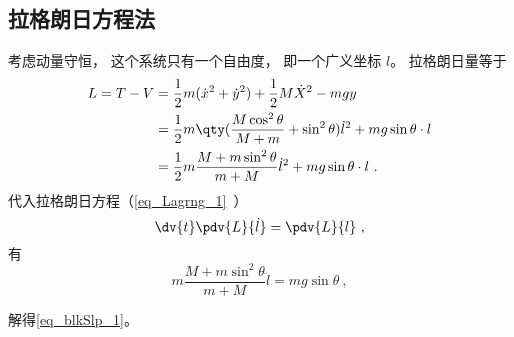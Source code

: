 \subsection{拉格朗日方程法}
考虑动量守恒， 这个系统只有一个自由度， 即一个广义坐标 $l$。 拉格朗日量等于
\begin{equation}
\begin{aligned}
L = T - V &= \frac12 m(\dot x^2 + \dot y^2) + \frac12 M \dot X^2 - mgy\\
&= \frac{1}{2}m \qty( \frac{M\cos^2\theta}{M + m}+\sin^2\theta) \dot l^2 + mg\sin\theta \cdot l\\
&=\frac{1}{2}m\frac{M+m\sin^2\theta}{m+M}\dot{l}^2+mg\sin\theta\cdot l~.
\end{aligned}
\end{equation}
代入拉格朗日方程（\autoref{eq_Lagrng_1}~）
\begin{equation}
\dv{t} \pdv{L}{\dot l} = \pdv{L}{l}~,
\end{equation}
有
\begin{equation}
m\frac{M+m\sin^2\theta}{m+M}\ddot{l}=mg\sin\theta~,
\end{equation}

解得\autoref{eq_blkSlp_1}。
